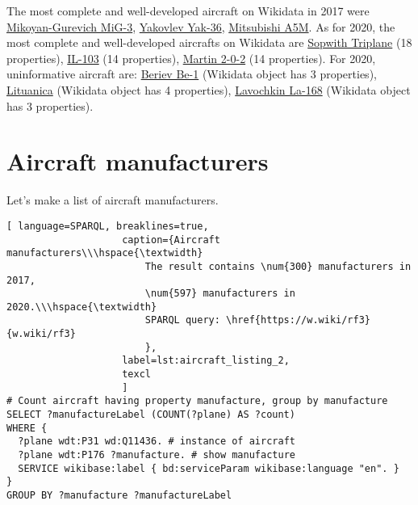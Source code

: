 The most complete and well-developed aircraft on Wikidata in 2017 were \href{https://www.wikidata.org/wiki/Q271446}{Mikoyan-Gurevich MiG-3}, 
\href{https://www.wikidata.org/wiki/Q1349098}{Yakovlev Yak-36}, \href{https://www.wikidata.org/wiki/Q429839}{Mitsubishi A5M}. 
As for 2020, the most complete and well-developed aircrafts on Wikidata are \href{https://www.wikidata.org/wiki/Q770863}{Sopwith Triplane} (18 properties), 
\href{https://www.wikidata.org/wiki/Q1658673}{IL-103} (14 properties), \href{https://www.wikidata.org/wiki/Q665071}{Martin 2-0-2} (14 properties).
For 2020, uninformative aircraft are: \href{https://www.wikidata.org/wiki/Q820603}{Beriev Be-1} (Wikidata object has 3 properties), \href{https://www.wikidata.org/wiki/Q117984}{Lituanica} (Wikidata object has 4 properties), 
\href{https://www.wikidata.org/wiki/Q572762}{Lavochkin La-168} (Wikidata object has 3 properties).


\section{Aircraft manufacturers}

Let's make a list of aircraft manufacturers.

\begin{lstlisting}[ language=SPARQL, breaklines=true, 
                    caption={Aircraft manufacturers\\\hspace{\textwidth}
                        The result contains \num{300} manufacturers in 2017, 
                        \num{597} manufacturers in 2020.\\\hspace{\textwidth}
                        SPARQL query: \href{https://w.wiki/rf3}{w.wiki/rf3}
                        },
                    label=lst:aircraft_listing_2,
                    texcl 
                    ]
# Count aircraft having property manufacture, group by manufacture
SELECT ?manufactureLabel (COUNT(?plane) AS ?count) 
WHERE {
  ?plane wdt:P31 wd:Q11436. # instance of aircraft
  ?plane wdt:P176 ?manufacture. # show manufacture
  SERVICE wikibase:label { bd:serviceParam wikibase:language "en". }
}
GROUP BY ?manufacture ?manufactureLabel
\end{lstlisting}

